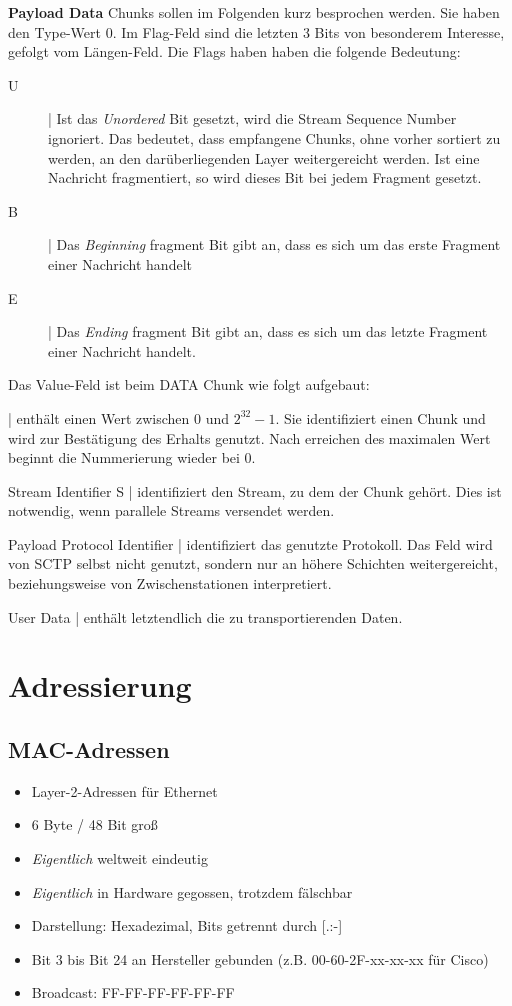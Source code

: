 \documentclass{article} %
\begin{document}
\textbf{Payload Data} Chunks sollen im Folgenden kurz besprochen werden.
Sie haben den Type-Wert 0.
Im Flag-Feld sind die letzten 3 Bits von besonderem Interesse, gefolgt vom Längen-Feld.
Die Flags haben haben die folgende Bedeutung:
\begin{description}
	\item[U] | Ist das \emph{Unordered} Bit gesetzt, wird die Stream Sequence Number ignoriert.
	Das bedeutet, dass empfangene Chunks, ohne vorher sortiert zu werden, an den darüberliegenden Layer weitergereicht werden.
	Ist eine Nachricht fragmentiert, so wird dieses Bit bei jedem Fragment gesetzt.
	\item[B] | Das \emph{Beginning} fragment Bit gibt an, dass es sich um das erste Fragment einer Nachricht handelt
	\item[E] | Das \emph{Ending} fragment Bit gibt an, dass es sich um das letzte Fragment einer Nachricht handelt.
\end{description}
Das Value-Feld ist beim DATA Chunk wie folgt aufgebaut:
\begin{description}
	\item[Transmission Sequence Number (TSN)] | enthält einen Wert zwischen 0 und $2^{32}-1$.
	Sie identifiziert einen Chunk und wird zur Bestätigung des Erhalts genutzt.
	Nach erreichen des maximalen Wert beginnt die Nummerierung wieder bei 0.
	\item {Stream Identifier S} | identifiziert den Stream, zu dem der Chunk gehört.
	Dies ist notwendig, wenn parallele Streams versendet werden.
	\item {Payload Protocol Identifier} | identifiziert das genutzte Protokoll.
	Das Feld wird von SCTP selbst nicht genutzt, sondern nur an höhere Schichten weitergereicht, beziehungsweise von Zwischenstationen interpretiert.
	\item {User Data} | enthält letztendlich die zu transportierenden Daten.
\end{description}


\section{Adressierung}
\subsection{MAC-Adressen}

\begin{itemize}
	\item Layer-2-Adressen für Ethernet
	\item 6 Byte / 48 Bit groß
	\item \emph{Eigentlich} weltweit eindeutig
	\item \emph{Eigentlich} in Hardware gegossen, trotzdem fälschbar
	\item Darstellung: Hexadezimal, Bits getrennt durch [.:-]
	\item Bit 3 bis Bit 24 an Hersteller gebunden (z.B. 00-60-2F-xx-xx-xx für Cisco)
	\item Broadcast: FF-FF-FF-FF-FF-FF 
\end{itemize}
\end{document}
